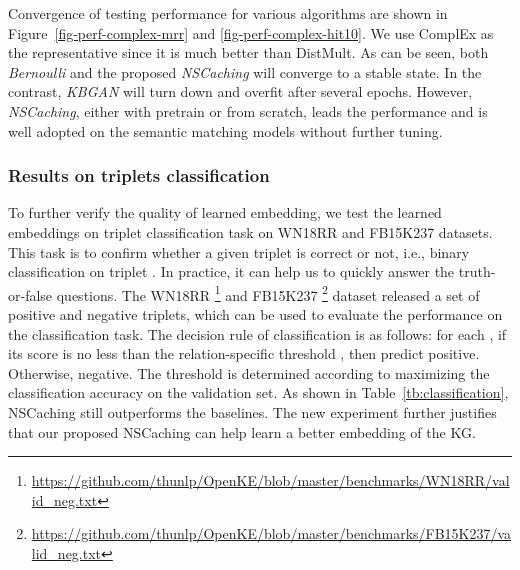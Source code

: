 \documentclass[conference]{IEEEtran}
\begin{document}
{Convergence of testing performance for various algorithms are shown in Figure~\ref{fig-perf-complex-mrr} and \ref{fig-perf-complex-hit10}.
We use ComplEx as the representative since it is much better than DistMult.
As can be seen,
both \textit{Bernoulli} and the proposed \textit{NSCaching} will converge to a stable state.
In the contrast, 
\textit{KBGAN} will turn down and overfit after several epochs.
However,
\textit{NSCaching}, either with pretrain or from scratch, leads the performance and is well adopted on the semantic matching models without further tuning.
}



\subsubsection{Results on triplets classification}


To further verify the quality of learned embedding, 
we test the learned embeddings on triplet classification task on WN18RR and FB15K237 datasets. 
This task is to confirm whether a given triplet  is correct or not, 
i.e., binary classification on triplet \cite{wang2014knowledge}. 
In practice, it can help us to quickly answer the truth-or-false questions.
The WN18RR 
\footnote{\url{https://github.com/thunlp/OpenKE/blob/master/benchmarks/WN18RR/valid_neg.txt}}
and FB15K237 
\footnote{\url{https://github.com/thunlp/OpenKE/blob/master/benchmarks/FB15K237/valid_neg.txt}}
dataset released a set of positive and negative triplets,
which can be used to evaluate the performance on the classification task.
The decision rule of classification is as follows: for each , if its score is no less than the relation-specific threshold , then predict positive. 
Otherwise, negative. The threshold  is determined according to 
maximizing the classification accuracy on the validation set.
As shown in Table~\ref{tb:classification}, NSCaching still outperforms the baselines. 
The new experiment further justifies that our proposed NSCaching can help learn a better embedding of the KG.
\end{document}
